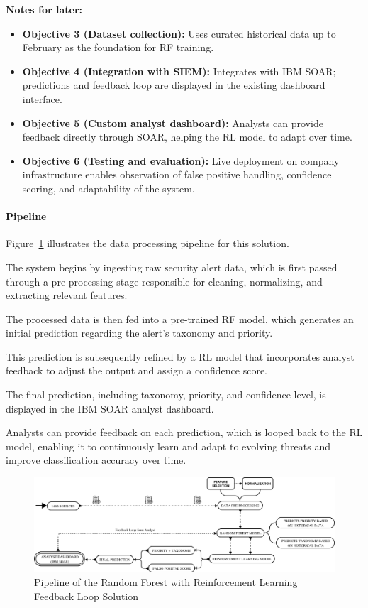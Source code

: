 \textbf{Notes for later:}
\begin{itemize}
    \item \textbf{Objective 3 (Dataset collection):} Uses curated historical data up to February as the foundation for \gls{RF} training.
    \item \textbf{Objective 4 (Integration with SIEM):} Integrates with IBM SOAR; predictions and feedback loop are displayed in the existing dashboard interface.
    \item \textbf{Objective 5 (Custom analyst dashboard):} Analysts can provide feedback directly through SOAR, helping the \gls{RL} model to adapt over time.
    \item \textbf{Objective 6 (Testing and evaluation):} Live deployment on company infrastructure enables observation of false positive handling, confidence scoring, and adaptability of the system.
\end{itemize}

\paragraph{Pipeline}

Figure~\ref{fig:solution1_pipeline} illustrates the data processing pipeline for this solution. 

The system begins by ingesting raw security alert data, which is first passed through a pre-processing stage responsible for cleaning, normalizing, and extracting relevant features. 

The processed data is then fed into a pre-trained \gls{RF} model, which generates an initial prediction regarding the alert's taxonomy and priority. 

This prediction is subsequently refined by a \gls{RL} model that incorporates analyst feedback to adjust the output and assign a confidence score. 

The final prediction, including taxonomy, priority, and confidence level, is displayed in the IBM SOAR analyst dashboard. 

Analysts can provide feedback on each prediction, which is looped back to the \gls{RL} model, enabling it to continuously learn and adapt to evolving threats and improve classification accuracy over time.

\begin{figure}[h]
    \centering
    \includegraphics[width=\textwidth]{ch3/assets/solution1_pipeline.png}
    \caption{Pipeline of the Random Forest with Reinforcement Learning Feedback Loop Solution}
    \label{fig:solution1_pipeline}
\end{figure}

